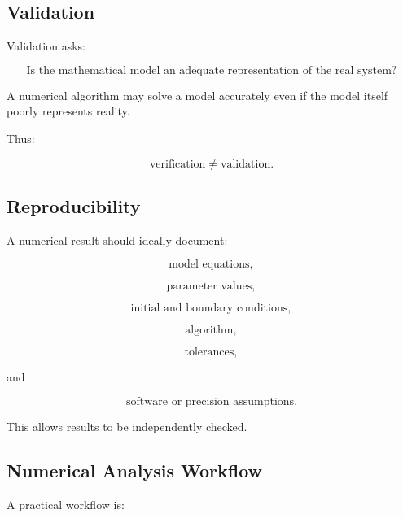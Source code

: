 \subsection{Validation}
\label{subsec:numerical-validation}

Validation asks:

\[
\boxed{
\text{Is the mathematical model an adequate representation of the real
system?}
}
\]

A numerical algorithm may solve a model accurately even if the model
itself poorly represents reality.

Thus:

\[
\boxed{
\text{verification}
\neq
\text{validation}.
}
\]

\subsection{Reproducibility}
\label{subsec:numerical-reproducibility}

A numerical result should ideally document:

\[
\boxed{
\text{model equations},
}
\]

\[
\boxed{
\text{parameter values},
}
\]

\[
\boxed{
\text{initial and boundary conditions},
}
\]

\[
\boxed{
\text{algorithm},
}
\]

\[
\boxed{
\text{tolerances},
}
\]

and

\[
\boxed{
\text{software or precision assumptions}.
}
\]

This allows results to be independently checked.

\subsection{Numerical Analysis Workflow}
\label{subsec:numerical-analysis-workflow}

A practical workflow is:

